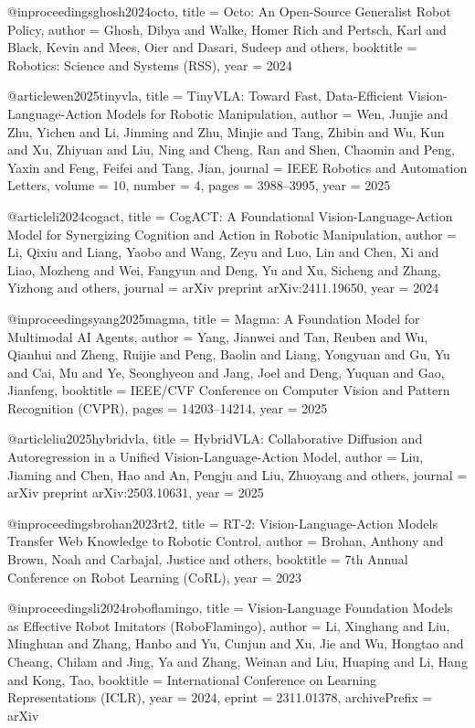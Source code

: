 @inproceedings{ghosh2024octo,
  title     = {Octo: An Open-Source Generalist Robot Policy},
  author    = {Ghosh, Dibya and Walke, Homer Rich and Pertsch, Karl
               and Black, Kevin and Mees, Oier and Dasari, Sudeep and others},
  booktitle = {Robotics: Science and Systems (RSS)},
  year      = {2024}
}

@article{wen2025tinyvla,
  title   = {{TinyVLA}: Toward Fast, Data-Efficient Vision-Language-Action Models for Robotic Manipulation},
  author  = {Wen, Junjie and Zhu, Yichen and Li, Jinming and Zhu, Minjie
             and Tang, Zhibin and Wu, Kun and Xu, Zhiyuan and Liu, Ning
             and Cheng, Ran and Shen, Chaomin and Peng, Yaxin and Feng, Feifei
             and Tang, Jian},
  journal = {IEEE Robotics and Automation Letters},
  volume  = {10},
  number  = {4},
  pages   = {3988--3995},
  year    = {2025}
}

@article{li2024cogact,
  title   = {{CogACT}: A Foundational Vision-Language-Action Model for Synergizing
             Cognition and Action in Robotic Manipulation},
  author  = {Li, Qixiu and Liang, Yaobo and Wang, Zeyu and Luo, Lin and Chen, Xi
             and Liao, Mozheng and Wei, Fangyun and Deng, Yu and Xu, Sicheng
             and Zhang, Yizhong and others},
  journal = {arXiv preprint arXiv:2411.19650},
  year    = {2024}
}

@inproceedings{yang2025magma,
  title     = {Magma: A Foundation Model for Multimodal {AI} Agents},
  author    = {Yang, Jianwei and Tan, Reuben and Wu, Qianhui and Zheng, Ruijie
               and Peng, Baolin and Liang, Yongyuan and Gu, Yu and Cai, Mu
               and Ye, Seonghyeon and Jang, Joel and Deng, Yuquan and Gao, Jianfeng},
  booktitle = {IEEE/CVF Conference on Computer Vision and Pattern Recognition (CVPR)},
  pages     = {14203--14214},
  year      = {2025}
}

@article{liu2025hybridvla,
  title   = {{HybridVLA}: Collaborative Diffusion and Autoregression in a Unified Vision-Language-Action Model},
  author  = {Liu, Jiaming and Chen, Hao and An, Pengju and Liu, Zhuoyang and others},
  journal = {arXiv preprint arXiv:2503.10631},
  year    = {2025}
}

@inproceedings{brohan2023rt2,
  title     = {{RT-2}: Vision-Language-Action Models Transfer Web Knowledge to Robotic Control},
  author    = {Brohan, Anthony and Brown, Noah and Carbajal, Justice and others},
  booktitle = {7th Annual Conference on Robot Learning (CoRL)},
  year      = {2023}
}

@inproceedings{li2024roboflamingo,
  title     = {Vision-Language Foundation Models as Effective Robot Imitators
               ({RoboFlamingo})},
  author    = {Li, Xinghang and Liu, Minghuan and Zhang, Hanbo and Yu, Cunjun
               and Xu, Jie and Wu, Hongtao and Cheang, Chilam and Jing, Ya
               and Zhang, Weinan and Liu, Huaping and Li, Hang and Kong, Tao},
  booktitle = {International Conference on Learning Representations (ICLR)},
  year      = {2024},
  eprint    = {2311.01378},
  archivePrefix = {arXiv}
}

